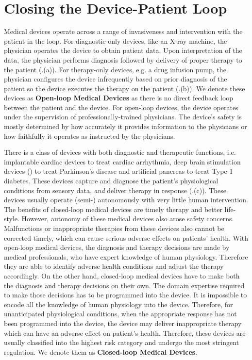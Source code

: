 \section{Closing the Device-Patient Loop}
Medical devices operate across a range of invasiveness and intervention with the patient in the loop. For diagnostic-only devices, like an X-ray machine, the physician operates the device to obtain patient data. Upon interpretation of the data, the physician performs diagnosis followed by delivery of proper therapy to the patient (.(a)). For therapy-only devices, e.g. a drug infusion pump, the physician configures the device infrequently based on prior diagnosis of the patient so the device executes the therapy on the patient (.(b)). We denote these devices as \textbf{Open-loop Medical Devices} as there is no direct feedback loop between the patient and the device. For open-loop devices, the device operates under the supervision of professionally-trained physicians. The device's safety is mostly determined by how accurately it provides information to the physicians or how faithfully it operates as instructed by the physicians.

There is a class of devices with both diagnostic and therapeutic functions, i.e. implantable cardiac devices to treat cardiac arrhythmia, deep brain stimulation devices (\cite{Brain_sti}) to treat Parkinson's disease and artificial pancreas to treat Type-1 diabetes. These devices capture and diagnose the patient's physiological conditions from sensory data, \emph{and} deliver therapy in response (.(c)). These devices usually operate (semi-) autonomously with very little human intervention. 
The benefits of closed-loop medical devices are timely therapy and better life-style.
However, autonomy of these medical devices also arose safety concerns. 
Malfunctions or inappropriate therapies from these devices also cannot be corrected timely, which can cause serious adverse effects on patients' health. 
With open-loop medical devices, the diagnosis and therapy decisions are made by medical professionals, who have expert knowledge of human physiology. Therefore they are able to identify adverse health conditions and adjust the therapy accordingly. On the other hand, closed-loop medical devices have to make both the diagnosis and therapy decisions on their own. The domain expertise required to make those decisions has to be programmed into the device. It is impossible to encode all the knowledge of human physiology into the device. Therefore, for unanticipated physiological conditions, when the appropriate response has not been programmed into the device, the device may deliver inappropriate therapy which can have an adverse effect on patient's health. 
Therefore, these devices are usually classified into the highest risk category and undergo the most stringent regulation. We denote them as \textbf{Closed-loop Medical Devices}. 

